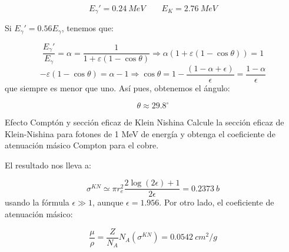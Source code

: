 $$ E_{\gamma}'  = 0.24 \ \unit{MeV} \qquad 
E_K = 2.76 \ \unit{MeV}$$

Si $E_{\gamma}'=0.56 E_{\gamma}$, tenemos que: 

\begin{equation*}
    \frac{E_{\gamma}'}{E_{\gamma}} = \alpha = \frac{1}{1+\varepsilon (1-\cos \theta)} \Rightarrow \alpha (1+\varepsilon (1-\cos \theta)) = 1 
\end{equation*}
\begin{equation*}
    -\varepsilon (1-\cos \theta) = \alpha-1 \Rightarrow \cos \theta =  1 -  \frac{(1-\alpha + \epsilon)}{\epsilon} = \frac{1-\alpha}{\epsilon}
\end{equation*}
que siempre es menor que uno. Así pues, obtenemos el ángulo: 

\begin{equation*}
    \theta \approx 29.8^\circ
\end{equation*}




\begin{Ejercicio}{Efecto Comptón y sección eficaz de Klein Nishina}
    Calcule la sección eficaz de Klein-Nishina para fotones de 1 MeV de energía y obtenga el coeficiente de atenuación másico Compton para el cobre.
\end{Ejercicio}

El resultado nos lleva a: 

\begin{equation}
    \sigma^{KN} \simeq \pi r_e^2 \frac{2\log(2\epsilon)+1}{2\epsilon} = 0.2373 \ \unit{b}
\end{equation}
usando la fórmula $\epsilon\gg 1$, aunque $\epsilon = 1.956$. Por otro lado, el coeficiente de atenuación másico: 

\begin{equation}
    \frac{\mu}{\rho} = \frac{Z}{N_A}N_A (\sigma^{KN}) = 0.0542 \ \unit{cm^2/g}
\end{equation}



